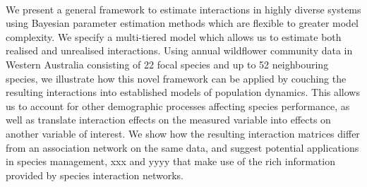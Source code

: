 \documentclass[a4,12pt]{article}
\begin{document}
    \paragraph{} %
    We present a general framework to estimate interactions in highly diverse systems using Bayesian parameter estimation methods which are flexible to greater model complexity. We specify a multi-tiered model which allows us to estimate both realised and unrealised interactions. Using annual wildflower community data in Western Australia consisting of 22 focal species and up to 52 neighbouring species, we illustrate how this novel framework can be applied by couching the resulting interactions into established models of population dynamics. This allows us to account for other demographic processes affecting species performance, as well as translate interaction effects on the measured variable into effects on another variable of interest. We show how the resulting interaction matrices differ from an association network on the same data, and suggest potential applications in species management, xxx and yyyy  that make use of the rich information provided by species interaction networks.

\end{document}
